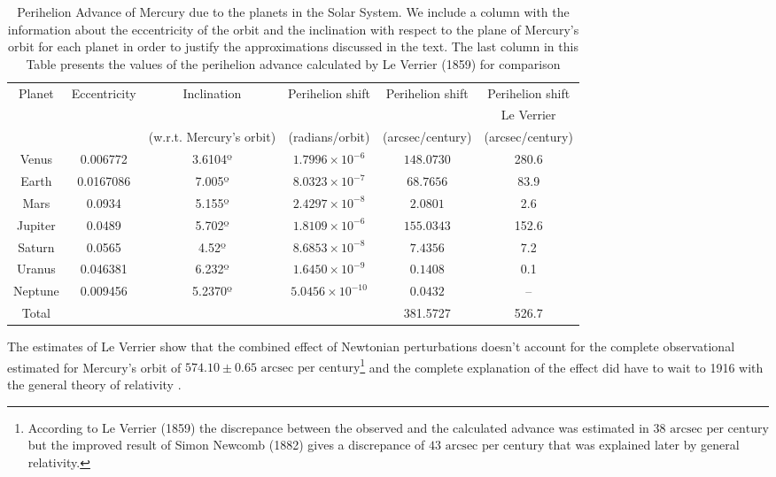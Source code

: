 \begin{table}[h]
\centering
\footnotesize
\begin{tabular}{|c|c|c|c|c|c|}
\hline
Planet & Eccentricity & Inclination & Perihelion shift & Perihelion shift & Perihelion shift\\
 & & & & & Le Verrier  \\ 
 & & {\tiny (w.r.t. Mercury's orbit)}& {\tiny (radians/orbit) } & {\tiny (arcsec/century)}  & {\tiny (arcsec/century)}  \\
\hline
Venus & 0.006772 & 3.6104º  & $ 1.7996\times 10^{-6} $ & $ 148.0730$ & 280.6 \\
Earth & 0.0167086 & 7.005º & $ 8.0323 \times 10^{-7} $ & $ 68.7656$ & 83.9 \\
Mars &	 0.0934 & 5.155º  & $ 2.4297 \times 10^{-8} $ & $ 2.0801$ & 2.6 \\
Jupiter	 & 0.0489 & 5.702º  & $ 1.8109\times 10^{-6} $ & $ 155.0343$ & 152.6 \\
Saturn	& 0.0565 & 4.52º  & $ 8.6853 \times 10^{-8} $& $ 7.4356$ & 7.2 \\
Uranus & 0.046381 & 6.232º & $ 1.6450 \times 10^{-9} $ & $0.1408$ & 0.1 \\
Neptune & 0.009456 & 5.2370º & $ 5.0456 \times 10^{-10} $ & $0.0432$ & -- \\
\hline
Total & & & & 381.5727 & 526.7 \\
\hline
\end{tabular}
\caption{Perihelion Advance of Mercury due to the planets in the Solar System. We include a column with the information about the eccentricity of the orbit and the inclination with respect to the plane of Mercury's orbit for each planet in order to justify the approximations discussed in the text. The last column in this Table presents the values of the perihelion advance calculated by Le Verrier (1859) \cite{LeVerrier1859, Krizek2017} for comparison}
\label{tab:MercuryPerihelionShift}
\end{table}

The estimates of  Le Verrier show that the combined effect of Newtonian perturbations doesn't account for the complete observational estimated for Mercury's orbit of $574.10 \pm 0.65 \textrm{ arcsec per century}$\footnote{According to Le Verrier (1859) the discrepance between the observed and the calculated advance was estimated in $38 \textrm{ arcsec per century}$ but the improved result of Simon Newcomb (1882) gives a discrepance of $43 \textrm{ arcsec per century}$ that was explained later by general relativity.} and the complete explanation of the effect did have to wait to 1916 with the general theory of relativity \cite{Clemence1947}.

